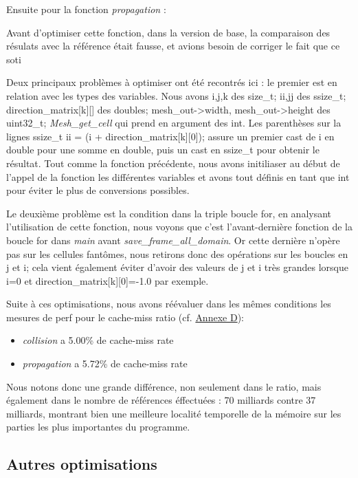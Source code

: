 Ensuite pour la fonction \textit{propagation} :

Avant d'optimiser cette fonction, dans la version de base, la comparaison des résulats avec la référence était fausse, et avions besoin de corriger le fait que ce soti 

Deux principaux problèmes à optimiser ont été recontrés ici : le premier est en relation avec les types des variables. Nous avons i,j,k des size\_t; ii,jj des ssize\_t; direction\_matrix[k][] des doubles; mesh\_out->width, mesh\_out->height des uint32\_t; \textit{Mesh\_get\_cell} qui prend en argument des int. Les parenthèses sur la lignes ssize\_t ii = (i + direction\_matrix[k][0]); assure un premier cast de i en double pour une somme en double, puis un cast en ssize\_t pour obtenir le résultat. Tout comme la fonction précédente, nous avons initiliaser au début de l'appel de la fonction les différentes variables et avons tout définis en tant que int pour éviter le plus de conversions possibles.

Le deuxième problème est la condition dans la triple boucle for, en analysant l'utilisation de cette fonction, nous voyons que c'est l'avant-dernière fonction de la boucle for dans \textit{main} avant \textit{save\_frame\_all\_domain}. Or cette dernière n'opère pas sur les cellules fantômes, nous retirons donc des opérations sur les boucles en j et i; cela vient également éviter d'avoir des valeurs de j et i très grandes lorsque i=0 et direction\_matrix[k][0]=-1.0 par exemple. 

Suite à ces optimisations, nous avons réévaluer dans les mêmes conditions les mesures de perf pour le cache-miss ratio (cf. \hyperref[fig:perf-naive]{Annexe D}):
\begin{itemize}
	\item[$\bullet$] \textit{collision} a 5.00\% de cache-miss rate
	\item[$\bullet$] \textit{propagation} a 5.72\% de cache-miss rate 
\end{itemize}

Nous notons donc une grande différence, non seulement dans le ratio, mais également dans le nombre de références éffectuées : 70 milliards contre 37 milliards, montrant bien une meilleure localité temporelle de la mémoire sur les parties les plus importantes du programme.

\subsection{Autres optimisations}

